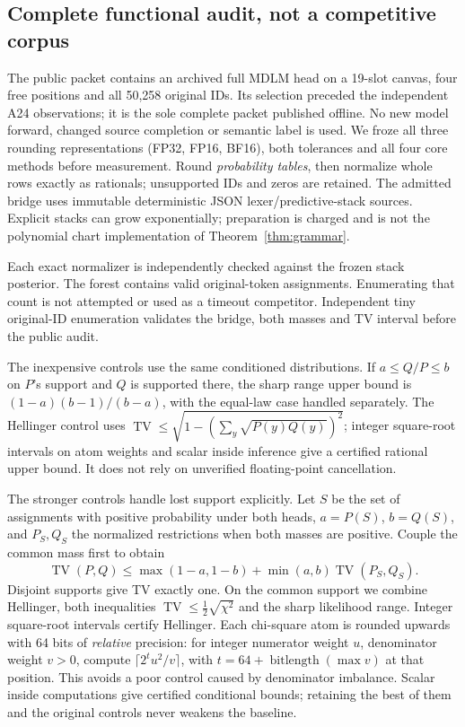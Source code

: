 \documentclass[11pt]{article}
\newcommand{\TV}{\operatorname{TV}}
\begin{document}
\subsection{Complete functional audit, not a competitive corpus}
The public packet contains an archived full MDLM head on a 19-slot canvas,
four free positions and all 50,258 original IDs. Its selection preceded the
independent A24 observations; it is the sole complete packet published offline.
No new model forward, changed source completion or semantic label is used.
We froze all three rounding representations (FP32, FP16, BF16), both
tolerances and all four core methods before measurement. Round \emph{probability tables}, then normalize
whole rows exactly as rationals; unsupported IDs and zeros are retained.
The admitted bridge uses immutable deterministic JSON lexer/predictive-stack
sources. Explicit stacks can grow exponentially; preparation is charged and
is not the polynomial chart implementation of Theorem~\ref{thm:grammar}.

Each exact normalizer is independently checked against the frozen stack
posterior. The forest contains \OriginalWordCount{} valid original-token
assignments. Enumerating that count is not attempted or used as a timeout
competitor. Independent tiny original-ID enumeration validates the bridge,
both masses and TV interval before the public audit.

The inexpensive controls use the same conditioned distributions.
If $a\leq Q/P\leq b$ on $P$'s support and $Q$ is supported there, the sharp
range upper bound is $(1-a)(b-1)/(b-a)$, with the equal-law case handled
separately. The Hellinger control uses
$\TV\leq\sqrt{1-(\sum_y\sqrt{P(y)Q(y)})^2}$; integer square-root intervals
on atom weights and scalar inside inference give a certified rational upper
bound. It does not rely on unverified floating-point cancellation.

The stronger controls handle lost support explicitly. Let $S$ be the set of
assignments with positive probability under both heads, $a=P(S)$, $b=Q(S)$,
and $P_S,Q_S$ the normalized restrictions when both masses are positive.
Couple the common mass first to obtain
\[
 \TV(P,Q)\leq\max(1-a,1-b)+\min(a,b)\TV(P_S,Q_S).
\]
Disjoint supports give TV exactly one. On the common support we combine
Hellinger, both inequalities
$\TV\leq\tfrac12\sqrt{\chi^2}$ and the sharp likelihood range. Integer
square-root intervals certify Hellinger. Each chi-square atom is rounded
upwards with 64 bits of \emph{relative} precision: for integer numerator
weight $u$, denominator weight $v>0$, compute
$\lceil 2^t u^2/v\rceil$, with $t=64+\operatorname{bitlength}(\max v)$
at that position. This avoids a poor control caused by denominator imbalance.
Scalar inside computations give certified conditional bounds; retaining the
best of them and the original controls never weakens the baseline.
\end{document}
